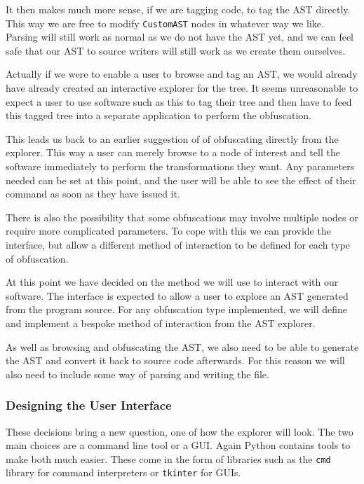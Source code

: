 \documentclass[twoside,a4paper]{report}
\begin{document}
It then makes much more sense, if we are tagging code, to tag the AST directly. This way we are free to modify \texttt{CustomAST}
nodes in whatever way we like. Parsing will still work as normal as we do not have the AST yet, and we can feel safe that our AST
to source writers will still work as we create them ourselves.

Actually if we were to enable a user to browse and tag an AST, we would already have already created an interactive explorer for
the tree. It seems unreasonable to expect a user to use software such as this to tag their tree and then have to feed this tagged
tree into a separate application to perform the obfuscation.

This leads us back to an earlier suggestion of of obfuscating directly from the explorer. This way
a user can merely browse to a node of interest and tell the software immediately to perform the transformations they want. Any
parameters needed can be set at this point, and the user will be able to see the effect of their command as soon as they have issued
it.

There is also the possibility that some obfuscations may involve multiple nodes or require more complicated parameters. To cope with
this we can provide the interface, but allow a different method of interaction to be defined for each type of obfuscation.

At this point we have decided on the method we will use to interact with our software. The interface is expected to allow a user to
explore an AST generated from the program source. For any obfuscation type implemented, we will define and implement a bespoke method
of interaction from the AST explorer.

As well as browsing and obfuscating the AST, we also need to be able to generate the AST and convert it back to source code afterwards.
For this reason we will also need to include some way of parsing and writing the file.

\subsubsection{Designing the User Interface}

These decisions bring a new question, one of how the explorer will look. The two main choices are a command line tool or a GUI. Again
Python contains tools to make both much easier. These come in the form of libraries such as the \texttt{cmd} library \cite{pycmd} for command
interpreters or \texttt{tkinter} \cite{pytkinter} for GUIs.
\end{document}
